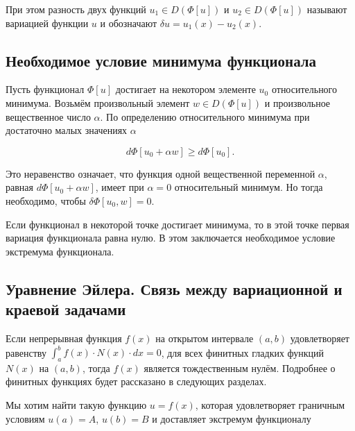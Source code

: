 \noindent При этом разность двух функций $u_{1} \in D(\Phi[u])$ и $u_{2} \in D(\Phi[u])$ называют вариацией функции $u$ и обозначают $\delta u = u_{1}(x) - u_{2}(x)$.


\subsection{Необходимое условие минимума функционала}\label{sub_section_minimum_conditions}

Пусть функционал $\Phi[u]$ достигает на некотором элементе $u_{0}$ относительного минимума. Возьмём произвольный элемент $w \in D(\Phi[u])$ и произвольное вещественное число $\alpha$. 
По определению относительного минимума при достаточно малых значениях $\alpha$

\begin{displaymath}
     d\Phi[u_{0} + \alpha w] \geq d\Phi[u_{0}].
\end{displaymath}

\noindent Это неравенство означает, что функция одной вещественной переменной $\alpha$, равная $d\Phi[u_{0} + \alpha w]$, имеет при $\alpha = 0$ относительный минимум. 
Но тогда необходимо, чтобы  $\delta \Phi[u_{0}, w] = 0$.

\begin{warn}[Важно!]
	Если функционал в некоторой точке достигает минимума, то в этой точке первая вариация функционала равна нулю. В этом заключается необходимое условие экстремума функционала.
\end{warn}


\subsection{Уравнение Эйлера. Связь между вариационной и краевой задачами}

\begin{warn}
	Если непрерывная функция $f(x)$ на открытом интервале $(a, b)$ удовлетворяет равенству $\int_{a}^{b} f(x) \cdot N(x) \cdot dx = 0$, 
	\noindent для всех финитных гладких функций $N(x)$ на $(a, b)$, тогда $f(x)$ является тождественным нулём. Подробнее о финитных функциях будет рассказано в следующих разделах.
\end{warn}

Мы хотим найти такую функцию $u = f(x)$, которая удовлетворяет граничным условиям $u(a) = A$, $u(b) = B$ и доставляет экстремум функционалу

